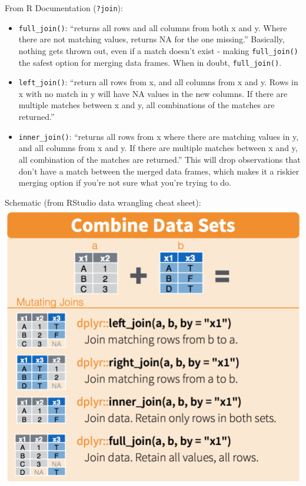 \documentclass[]{book}
\begin{document}
From R Documentation (\texttt{?join}):

\begin{itemize}
\item
  \texttt{full\_join()}: ``returns all rows and all columns from both x and y. Where there are not matching values, returns NA for the one missing.'' Basically, nothing gets thrown out, even if a match doesn't exist - making \texttt{full\_join()} the safest option for merging data frames. When in doubt, \texttt{full\_join()}.
\item
  \texttt{left\_join()}: ``return all rows from x, and all columns from x and y. Rows in x with no match in y will have NA values in the new columns. If there are multiple matches between x and y, all combinations of the matches are returned.''
\item
  \texttt{inner\_join()}: ``returns all rows from x where there are matching values in y, and all columns from x and y. If there are multiple matches between x and y, all combination of the matches are returned.'' This will drop observations that don't have a match between the merged data frames, which makes it a riskier merging option if you're not sure what you're trying to do.
\end{itemize}

Schematic (from RStudio data wrangling cheat sheet):
\includegraphics{img/rstudio-cheatsheet-combine-options1.png}
\end{document}
